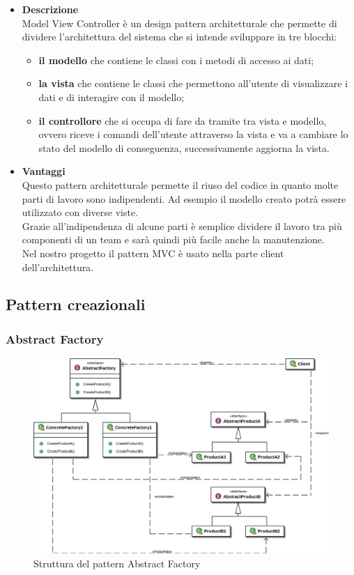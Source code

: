 		\begin{itemize}	
			\item \textbf{Descrizione} \\ Model View Controller è un design pattern architetturale che permette di dividere l'architettura del sistema che si intende sviluppare in tre blocchi:
			\begin{itemize}
				\item \textbf{il modello} che contiene le classi con i metodi di accesso ai dati;
				\item \textbf{la vista} che contiene le classi che permettono all'utente di visualizzare i dati e di interagire con il modello;
				\item \textbf{il controllore} che si occupa di fare da tramite tra vista e modello, ovvero riceve i comandi dell'utente attraverso la vista e va a cambiare lo stato del modello di conseguenza, successivamente aggiorna la vista.				
			\end{itemize}
			
			\item \textbf{Vantaggi} \\
			Questo pattern architetturale permette il riuso del codice in quanto molte parti di lavoro sono indipendenti. Ad esempio il modello creato potrà essere utilizzato con diverse viste. \\ Grazie all'indipendenza di alcune parti è semplice dividere il lavoro tra più componenti di un team e sarà quindi più facile anche la manutenzione.
			\utilizzo \\
			Nel nostro progetto il pattern MVC è usato nella parte client dell'architettura. 
		\end{itemize}
		
		\newpage
		
\subsection{Pattern creazionali}
	\subsubsection{Abstract Factory}
	
	\begin{figure}[!h]
		\centering
		\includegraphics[scale=0.2]{img/abstract_factory}  
		\caption{Struttura del pattern Abstract Factory}
	\end{figure}
	
